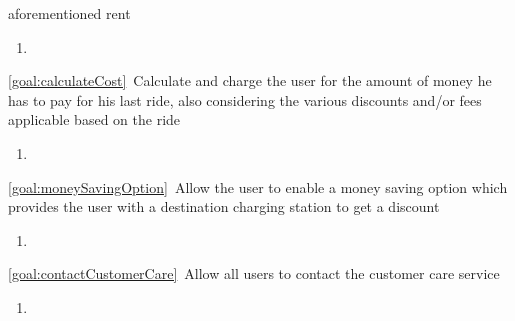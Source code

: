 \begin{description}
  		aforementioned rent 
  			\begin{enumerate}[resume*]
  				\item
   			\end{enumerate}
  		\item \ref{goal:calculateCost}\ Calculate and charge the user for the amount of money he has
  		to pay for his last ride, also considering the various discounts and/or fees applicable based on
  		the ride
  			\begin{enumerate}[resume*]
  				\item
   			\end{enumerate}
  		\item \ref{goal:moneySavingOption}\ Allow the user to enable a money saving option which
  		provides the user with a destination charging station to get a discount
  			\begin{enumerate}[resume*]
  				\item
   			\end{enumerate}
  		\item \ref{goal:contactCustomerCare}\ Allow all users to contact the customer care service
  			\begin{enumerate}[resume*]
  				\item
   			\end{enumerate}
  	\end{description}

